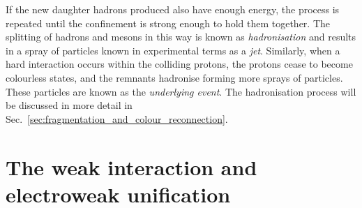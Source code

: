 If the new daughter hadrons produced also have enough energy, the process is repeated until the confinement is strong enough to hold them together.
The splitting of hadrons and mesons in this way is known as \textit{hadronisation} and results in a spray of particles known in experimental terms as a \textit{jet}.
Similarly, when a hard interaction occurs within the colliding protons, the protons cease to become colourless states, and the remnants hadronise forming more sprays of particles.
These particles are known as the \textit{underlying event}.
The hadronisation process will be discussed in more detail in Sec.~\ref{sec:fragmentation_and_colour_reconnection}.



\section{The weak interaction and electroweak unification}
\label{sec:EWK}

